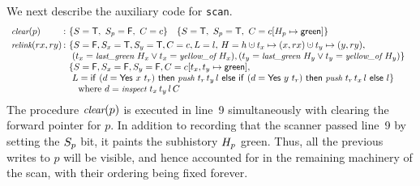 %


We next describe the auxiliary code for {\tt scan}.
\[
\begin{array}{l@{\, :\ }l}
  \aux{clear}(p) &
      \{\s = \TT,\ \spp = \FF,\ \C = c \}\quad
      \{\s = \TT,\ \spp = \TT,\
      \C = c[\histp \hpts \mathsf{green}] \}\\[3pt]
   \aux{relink}(rx, ry) &
  \!\!\! \begin{array}[t]{l}
    \{\s = \FF, \sx =\TT, \sy = \TT, \C = c, \ordlist = l,\, %
        \hist = h \hunion t_x \hpts (x, rx) \hunion t_y \hpts (y, ry),\\
      \ (t_x = \aux{last\_green}\ \histx \vee
          t_x = \aux{yellow\_of}\ \histx), (t_y = \aux{last\_green}\ \histy \vee
          t_y = \aux{yellow\_of}\ \histy) \}\\
    \{\s = \FF, \sx=\FF, \sy=\FF,%
        \C = c[t_x, t_y \hpts \mathsf{green}],\,\\
      \ \ordlist = \mathsf{if}\ (d = \mathsf{Yes}\ x\ t_r)\
                \mathsf{then}\ \aux{push}\ t_r\, t_y\, l\
                 \mathsf{else\ if}\
                 (d = \mathsf{Yes}\ y\ t_r)\ \mathsf{then}\
                 \aux{push}\ t_r\, t_x\, l\ \mathsf{else}\ l\}\\
  \quad \mbox{where $d = \aux{inspect}\ t_x\, t_y\, l\, \C$}
  \end{array}
\end{array}
\]
%
The procedure $\textit{\small{clear}}(p)$ is executed in line~9 simultaneously
with clearing the forward pointer for $p$. In addition to recording
that the scanner passed line~9 by setting the $S_p$ bit, it paints
the subhistory $H_p$ green. Thus, all the previous writes to $p$
will be visible, and hence accounted for in the remaining machinery of
the scan, with their ordering being fixed forever.

